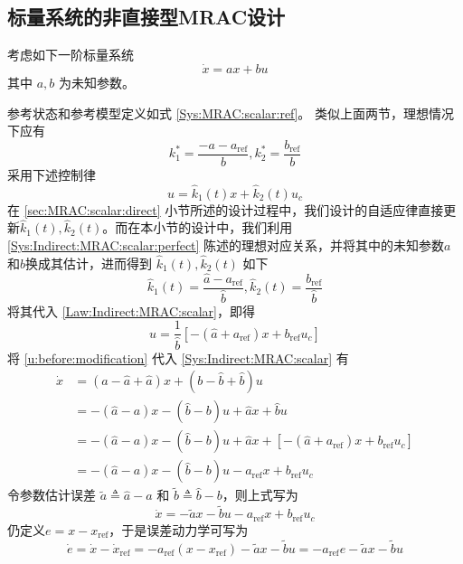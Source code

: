\subsection{标量系统的非直接型MRAC设计}

考虑如下一阶标量系统
\begin{equation}
  \dot{x} = a x + b  u \label{Sys:Indirect:MRAC:scalar}
\end{equation}
其中 $a, b$ 为未知参数。

参考状态和参考模型定义如式 \eqref{Sys:MRAC:scalar:ref}。
类似上面两节，理想情况下应有
\begin{equation}
  k^{\ast}_1 = \frac{-a - a_{\ensuremath{\operatorname{ref}}}}{b}, k^{\ast}_2 =
  \frac{b_{\ensuremath{\operatorname{ref}}}}{b}
  \label{Sys:Indirect:MRAC:scalar:perfect}
\end{equation}
采用下述控制律
\begin{equation}
  u = \hat{k}_1 (t) x + \hat{k}_2 (t) u_c\label{Law:Indirect:MRAC:scalar}
\end{equation}
在 \ref{sec:MRAC:scalar:direct} 小节所述的设计过程中，我们设计的自适应律直接更新$\hat{k}_1 (t), \hat{k}_2 (t)$。而在本小节的设计中，我们利用
\eqref{Sys:Indirect:MRAC:scalar:perfect} 陈述的理想对应关系，并将其中的未知参数$a$和$b$换成其估计，进而得到 $\hat{k}_1 (t), \hat{k}_2 (t)$ 如下
\[ \hat{k}_1 (t) = \frac{\hat{a} -
   a_{\ensuremath{\operatorname{ref}}}}{\hat{b}}, \hat{k}_2 (t) =
   \frac{b_{\ensuremath{\operatorname{ref}}}}{\hat{b}} \]
将其代入 \eqref{Law:Indirect:MRAC:scalar}，即得
\begin{equation}
  u = \frac{1}{\hat{b}} [-(\hat{a} + a_{\ensuremath{\operatorname{ref}}}) x +
  b_{\ensuremath{\operatorname{ref}}} u_c] \label{u:before:modification}
\end{equation}
将 \eqref{u:before:modification} 代入 \eqref{Sys:Indirect:MRAC:scalar} 有
\begin{align}
  \dot{x} & = (a - \hat{a} + \hat{a})  x + (b - \hat{b} + \hat{b} ) u
  \nonumber\\
  & = -(\hat{a} - a)  x -(\hat{b} -b)  u + \hat{a} x + \hat{b} u \nonumber\\
  & = -(\hat{a} - a)  x -(\hat{b} -b)  u + \hat{a} x + [-(\hat{a} + a_{\ensuremath{\operatorname{ref}}}) x +
  b_{\ensuremath{\operatorname{ref}}} u_c]\nonumber \\
  & = -(\hat{a} - a)  x -(\hat{b} -b)  u -a_{\ensuremath{\operatorname{ref}}} x +
  b_{\ensuremath{\operatorname{ref}}} u_c \nonumber
\end{align}
令参数估计误差 $\tilde{a}  \triangleq \hat{a} - a$ 和 $\tilde{b}  \triangleq \hat{b} -b$，则上式写为
\begin{equation*}
   \dot{x}  = -\tilde{a}  x - \tilde{b}  u - a_{\ensuremath{\operatorname{ref}}} x +
  b_{\ensuremath{\operatorname{ref}}} u_c
\end{equation*}
仍定义$e=x-x_{\operatorname{ref}}$，于是误差动力学可写为
\begin{equation}
  \dot{e} =\dot{x}-\dot{x}_{\operatorname{ref}}= - a_{\ensuremath{\operatorname{ref}}} (x-x_{\operatorname{ref}})- \tilde{a}  x - \tilde{b}u= -a_{\ensuremath{\operatorname{ref}}} e - \tilde{a}  x - \tilde{b}u\label{error_dyn_indirect}
\end{equation}

